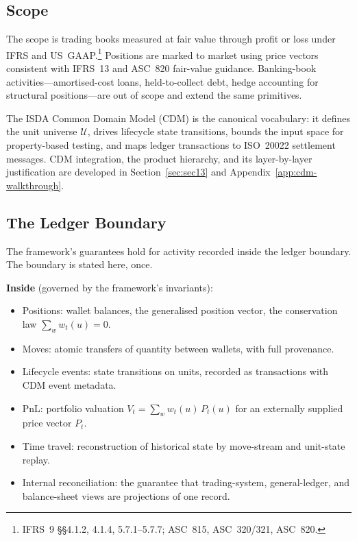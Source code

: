 \subsection{Scope}

The scope is trading books measured at fair value through profit or loss under IFRS and US~GAAP.\footnote{IFRS~9 \S\S4.1.2, 4.1.4, 5.7.1--5.7.7; ASC~815, ASC~320/321, ASC~820.} Positions are marked to market using price vectors consistent with IFRS~13 and ASC~820 fair-value guidance. Banking-book activities---amortised-cost loans, held-to-collect debt, hedge accounting for structural positions---are out of scope and extend the same primitives.

The ISDA Common Domain Model (CDM) is the canonical vocabulary: it defines the unit universe $\mathcal{U}$, drives lifecycle state transitions, bounds the input space for property-based testing, and maps ledger transactions to ISO~20022 settlement messages. CDM integration, the product hierarchy, and its layer-by-layer justification are developed in Section~\ref{sec:sec13} and Appendix~\ref{app:cdm-walkthrough}.

\subsection{The Ledger Boundary}
\label{sec:scope-overview}

The framework's guarantees hold for activity recorded inside the ledger boundary. The boundary is stated here, once.

\medskip
\noindent\textbf{Inside} (governed by the framework's invariants):
\begin{itemize}[nosep]
\item Positions: wallet balances, the generalised position vector, the conservation law $\sum_w w_t(u) = 0$.
\item Moves: atomic transfers of quantity between wallets, with full provenance.
\item Lifecycle events: state transitions on units, recorded as transactions with CDM event metadata.
\item PnL: portfolio valuation $V_t = \sum_w w_t(u)\,P_t(u)$ for an externally supplied price vector $P_t$.
\item Time travel: reconstruction of historical state by move-stream and unit-state replay.
\item Internal reconciliation: the guarantee that trading-system, general-ledger, and balance-sheet views are projections of one record.
\end{itemize}


